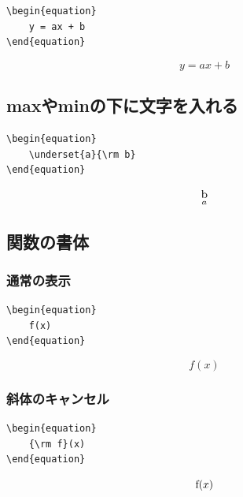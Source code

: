 \documentclass[11pt,a4paper]{jsarticle}
\begin{document}
\begin{lstlisting}
\begin{equation}
	y = ax + b
\end{equation}
\end{lstlisting}

\begin{equation}
	y = ax + b
\end{equation}

\subsection{maxやminの下に文字を入れる}

\begin{lstlisting}
\begin{equation}
	\underset{a}{\rm b}
\end{equation}
\end{lstlisting}

\begin{equation}
	\underset{a}{\rm b}
\end{equation}

\subsection{関数の書体}

\subsubsection{通常の表示}

\begin{lstlisting}
\begin{equation}
	f(x)
\end{equation}
\end{lstlisting}

\begin{equation}
	f(x)
\end{equation}


\subsubsection{斜体のキャンセル}

\begin{lstlisting}
\begin{equation}
	{\rm f}(x)
\end{equation}
\end{lstlisting}

\begin{equation}
	{\rm f}(x)
\end{equation}
\end{document}
